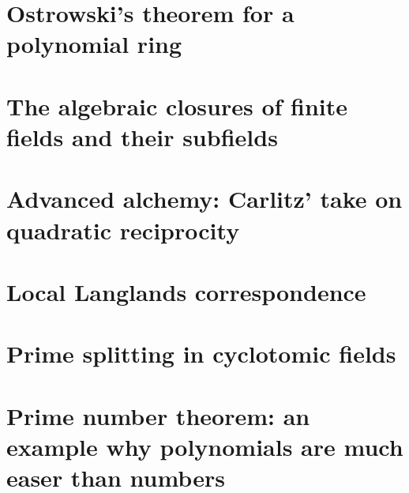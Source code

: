 \documentclass[a4paper]{memoir}
\begin{document}
\section{Ostrowski's theorem for a polynomial ring}


\section{The algebraic closures of finite fields and their subfields}


\section{Advanced alchemy: Carlitz' take on quadratic reciprocity}


\section{Local Langlands correspondence}


\section{Prime splitting in cyclotomic fields}

\section{Prime number theorem: an example why polynomials are much easer than numbers}



\end{document}
